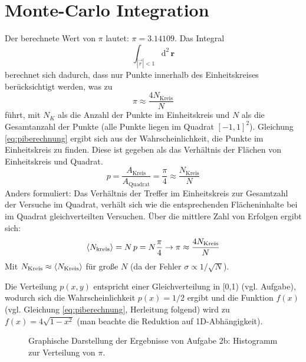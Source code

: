 \section*{Monte-Carlo Integration}
Der berechnete Wert von $\pi$ lautet: $\pi = 3.14109$. Das Integral
\begin{equation}
\int_{|\vec{r}|<1} \mathup{d^2\,\textbf{r}}
\end{equation}
berechnet sich dadurch, dass nur Punkte innerhalb des Einheitskreises berücksichtigt werden, was zu 
\begin{equation}
\pi \approx \frac{4N_{\text{Kreis}}}{N}
\label{eq:piberechnung}
\end{equation} führt, mit $N_K$ als die Anzahl der Punkte im Einheitskreis und $N$ als die Gesamtanzahl der Punkte (alle Punkte liegen im Quadrat $[-1,1]^2$). 
Gleichung \ref{eq:piberechnung} ergibt sich aus der Wahrscheinlichkeit, die Punkte im Einheitskreis zu finden. Diese ist gegeben als das Verhältnis der Flächen von Einheitskreis und Quadrat.
\begin{equation}
p = \frac{A_{\text{Kreis}}}{A_{\text{Quadrat}}} = \frac{\pi}{4} \approx \frac{N_{\text{Kreis}}}{N}
\end{equation}
Anders formuliert: Das Verhältnis der Treffer im Einheitskreis zur Gesamtzahl der Versuche im Quadrat, verhält sich wie die entsprechenden Flächeninhalte bei im Quadrat gleichverteilten Versuchen.
Über die mittlere Zahl von Erfolgen ergibt sich:
\begin{equation}
\braket{N_{\text{kreis}}} = N\,p = N\frac{\pi}{4} \rightarrow \pi \approx \frac{4N_{\text{Kreis}}}{N}
\end{equation}
Mit $N_{\text{Kreis}} \approx \braket{N_{\text{Kreis}}}$ für große $N$ (da der Fehler $\sigma \propto 1/\sqrt{N}$).

Die Verteilung $p(x,y)$ entspricht einer Gleichverteilung in [0,1) (vgl. Aufgabe), wodurch sich die Wahrscheinlichkeit $p(x) = 1/2$ ergibt und die Funktion $f(x)$ (vgl. Gleichung \ref{eq:piberechnung}, Herleitung folgend) wird zu $f(x) = 4 \sqrt{1-x^2}$ (man beachte die Reduktion auf 1D-Abhängigkeit).
\begin{landscape}
	\begin{figure}
		\caption{Graphische Darstellung der Ergebnisse von Aufgabe 2b: Histogramm zur Verteilung von $\pi$.}
		\label{fig:2bhist}
	\end{figure}
\end{landscape}

